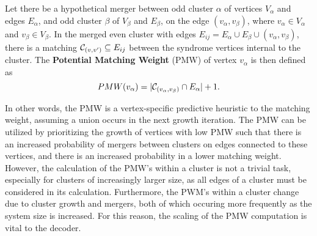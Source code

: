 \begin{definition}\label{def:pmw}
    Let there be a hypothetical merger between odd cluster $\alpha$ of vertices $V_\alpha$ and edges $E_\alpha$, and odd cluster $\beta$ of $V_\beta$ and $E_\beta$, on the edge $(v_\alpha, v_\beta)$, where $v_\alpha \in V_\alpha$ and $v_\beta \in V_\beta$. In the merged even cluster with edges $E_{ij} = E_\alpha \cup E_\beta \cup (v_\alpha, v_\beta)$, there is a matching $\mathcal{C}_{(v,v')} \subseteq E_{ij}$  between the syndrome vertices internal to the cluster. The \textbf{Potential Matching Weight} (PMW) of vertex $v_\alpha$ is then defined as
    \begin{equation}
      PMW(v_\alpha) = \lvert\mathcal{C}_{(v_\alpha,v_\beta)} \cap E_\alpha\rvert + 1.
    \end{equation}
\end{definition}

In other words, the PMW is a vertex-specific predictive heuristic to the matching weight, assuming a union occurs in the next growth iteration. The PMW can be utilized by prioritizing the growth of vertices with low PMW such that there is an increased probability of mergers between clusters on edges connected to these vertices, and there is an increased probability in a lower matching weight. However, the calculation of the PMW's within a cluster is not a trivial task, especially for clusters of increasingly larger size, as all edges of a cluster must be considered in its calculation. Furthermore, the PWM's within a cluster change due to cluster growth and mergers, both of which occuring more frequently as the system size is increased. For this reason, the scaling of the PMW computation is vital to the decoder. 

